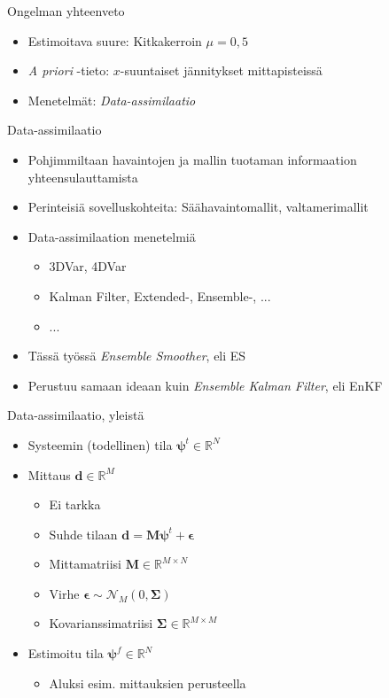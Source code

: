 \documentclass{beamer}
\begin{document}
\begin{frame}{Ongelman yhteenveto}

\begin{itemize}
\item Estimoitava suure: Kitkakerroin $\mu=0{,}5$
\item \emph{A priori} -tieto: $x$-suuntaiset jännitykset mittapisteissä
\item Menetelmät: \emph{Data-assimilaatio}
\end{itemize}

\end{frame}

\begin{frame}{Data-assimilaatio}

\begin{itemize}
\item Pohjimmiltaan havaintojen ja mallin tuotaman informaation yhteensulauttamista
\item Perinteisiä sovelluskohteita: Säähavaintomallit, valtamerimallit
\item Data-assimilaation menetelmiä
\begin{itemize}
\item 3DVar, 4DVar
\item Kalman Filter, Extended-, Ensemble-, ...
\item ...
\end{itemize}
\item Tässä työssä \emph{Ensemble Smoother}, eli ES
\item Perustuu samaan ideaan kuin \emph{Ensemble Kalman Filter}, eli EnKF
\end{itemize}

\end{frame}

\begin{frame}{Data-assimilaatio, yleistä}

\begin{itemize}
\item Systeemin (todellinen) tila $\boldsymbol{\psi}^t \in \mathbb{R}^N$
\item Mittaus $\boldsymbol{d} \in \mathbb{R}^M$
\begin{itemize}
\item Ei tarkka
\item Suhde tilaan $\boldsymbol{d} = \mathbf{M}\boldsymbol{\psi}^t+\boldsymbol{\epsilon}$
\item Mittamatriisi $\mathbf{M} \in \mathbb{R}^{M \times N}$
\item Virhe $\boldsymbol{\epsilon} \sim \mathcal{N}_M(0,\boldsymbol{\Sigma})$
\item Kovarianssimatriisi $\boldsymbol{\Sigma} \in \mathbb{R}^{M \times M}$
\end{itemize}
\item Estimoitu tila $\boldsymbol{\psi}^f \in \mathbb{R}^N$
\begin{itemize}
\item Aluksi esim. mittauksien perusteella
\end{itemize}
\end{itemize}

\end{frame}
\end{document}
